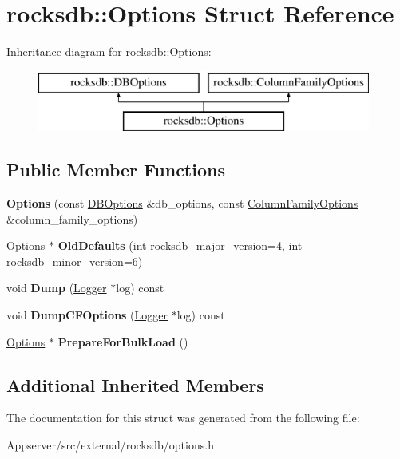 \hypertarget{structrocksdb_1_1Options}{}\section{rocksdb\+:\+:Options Struct Reference}
\label{structrocksdb_1_1Options}
Inheritance diagram for rocksdb\+:\+:Options\+:\begin{figure}[H]
\begin{center}
\leavevmode
\includegraphics[height=2.000000cm]{structrocksdb_1_1Options}
\end{center}
\end{figure}
\subsection*{Public Member Functions}
\begin{DoxyCompactItemize}
\item 
{\bfseries Options} (const \hyperlink{structrocksdb_1_1DBOptions}{D\+B\+Options} \&db\+\_\+options, const \hyperlink{structrocksdb_1_1ColumnFamilyOptions}{Column\+Family\+Options} \&column\+\_\+family\+\_\+options)\hypertarget{structrocksdb_1_1Options_a7935754a013c35598bc8d20161930263}{}\label{structrocksdb_1_1Options_a7935754a013c35598bc8d20161930263}

\item 
\hyperlink{structrocksdb_1_1Options}{Options} $\ast$ {\bfseries Old\+Defaults} (int rocksdb\+\_\+major\+\_\+version=4, int rocksdb\+\_\+minor\+\_\+version=6)\hypertarget{structrocksdb_1_1Options_afc43721c517950f4e21881448769431e}{}\label{structrocksdb_1_1Options_afc43721c517950f4e21881448769431e}

\item 
void {\bfseries Dump} (\hyperlink{classrocksdb_1_1Logger}{Logger} $\ast$log) const\hypertarget{structrocksdb_1_1Options_a519e1138b450c270f64ca0f5ae42af9c}{}\label{structrocksdb_1_1Options_a519e1138b450c270f64ca0f5ae42af9c}

\item 
void {\bfseries Dump\+C\+F\+Options} (\hyperlink{classrocksdb_1_1Logger}{Logger} $\ast$log) const\hypertarget{structrocksdb_1_1Options_a4e5e05adf317a6aa7b721a41e09b5a95}{}\label{structrocksdb_1_1Options_a4e5e05adf317a6aa7b721a41e09b5a95}

\item 
\hyperlink{structrocksdb_1_1Options}{Options} $\ast$ {\bfseries Prepare\+For\+Bulk\+Load} ()\hypertarget{structrocksdb_1_1Options_ac0a0acc8e851c5fd7ac5dc9e832e0314}{}\label{structrocksdb_1_1Options_ac0a0acc8e851c5fd7ac5dc9e832e0314}

\end{DoxyCompactItemize}
\subsection*{Additional Inherited Members}


The documentation for this struct was generated from the following file\+:\begin{DoxyCompactItemize}
\item 
Appserver/src/external/rocksdb/options.\+h\end{DoxyCompactItemize}
